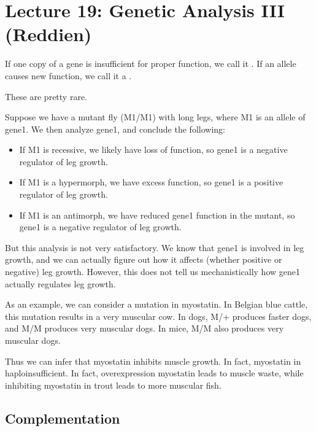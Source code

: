 \section*{Lecture 19: Genetic Analysis III (Reddien)}
\setcounter{section}{19}

\begin{defn}
	If one copy of a gene is insufficient for proper function, we call it .
	If an allele causes new function, we call it a .
\end{defn}

These are pretty rare.

\begin{exper}
	Suppose we have a mutant fly (M1/M1) with long legs, where M1 is an allele of gene1. We then analyze gene1, and conclude the following:
	\begin{itemize}
		\item If M1 is recessive, we likely have loss of function, so gene1 is a negative regulator of leg growth.
		\item If M1 is a hypermorph, we have excess function, so gene1 is a positive regulator of leg growth.
		\item If M1 is an antimorph, we have reduced gene1 function in the mutant, so gene1 is a negative regulator of leg growth.
	\end{itemize}
\end{exper}

But this analysis is not very satisfactory. 
We know that gene1 is involved in leg growth, and we can actually figure out how it affects (whether positive or negative) leg growth.
However, this does not tell us mechanistically how gene1 actually regulates leg growth.

\begin{exm}
	As an example, we can consider a mutation in myostatin. 
	In Belgian blue cattle, this mutation results in a very muscular cow.
	In dogs, M/+ produces faster dogs, and M/M produces very muscular dogs.
	In mice, M/M also produces very muscular dogs.

	Thus we can infer that myostatin inhibits muscle growth. In fact, myostatin in haploinsufficient.
	In fact, overexpression myostatin leads to muscle waste, while inhibiting myostatin in trout leads to more muscular fish.
\end{exm}

\subsection{Complementation}

